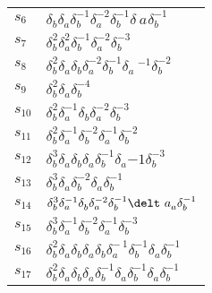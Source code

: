 \documentclass{article}
\begin{document}
\begin{center}
\begin{tabular}{ll}
$s_{6}$ & $\delta_b^{}\delta_a^{}\delta_b^{-1}\delta_a^{-2}\delta_b^{-1}\delta_\
a^{}\delta_b^{-1}$ \\
$s_{7}$ & $\delta_b^{2}\delta_a^{2}\delta_b^{-1}\delta_a^{-2}\delta_b^{-3}$ \\
$s_{8}$ & $\delta_b^{2}\delta_a^{}\delta_b^{}\delta_a^{-2}\delta_b^{-1}\delta_a\
^{-1}\delta_b^{-2}$ \\
$s_{9}$ & $\delta_b^{2}\delta_a^{}\delta_b^{-4}$ \\
$s_{10}$ & $\delta_b^{2}\delta_a^{-1}\delta_b^{}\delta_a^{-2}\delta_b^{-3}$ \\
$s_{11}$ & $\delta_b^{2}\delta_a^{-1}\delta_b^{-2}\delta_a^{-1}\delta_b^{-2}$ \\
$s_{12}$ & $\delta_b^{3}\delta_a^{}\delta_b^{}\delta_a^{}\delta_b^{-1}\delta_a^\
{-1}\delta_b^{-3}$ \\
$s_{13}$ & $\delta_b^{3}\delta_a^{}\delta_b^{-2}\delta_a^{}\delta_b^{-1}$ \\
$s_{14}$ & $\delta_b^{3}\delta_a^{-1}\delta_b^{}\delta_a^{-2}\delta_b^{-1}\delt\
a_a^{}\delta_b^{-1}$ \\
$s_{15}$ & $\delta_b^{3}\delta_a^{-1}\delta_b^{-2}\delta_a^{-1}\delta_b^{-3}$ \\
$s_{16}$ & $\delta_b^{2}\delta_a^{}\delta_b^{}\delta_a^{}\delta_b^{}\delta_a^{-\
1}\delta_b^{-1}\delta_a^{}\delta_b^{-1}$ \\
$s_{17}$ & $\delta_b^{2}\delta_a^{}\delta_b^{}\delta_a^{}\delta_b^{-1}\delta_a^\
{}\delta_b^{-1}\delta_a^{}\delta_b^{-1}$ \\
\bottomrule
\end{tabular}
\end{center}

\thispagestyle{empty}
\end{document}
